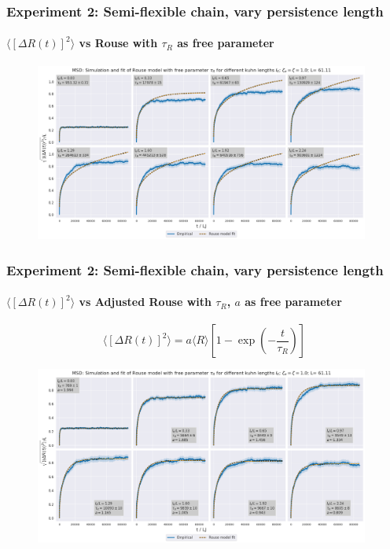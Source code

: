 \documentclass[handout]{beamer}
\newcommand{\mean}[1]{\langle #1 \rangle}
\begin{document}
\begin{frame}
    \frametitle{Experiment 2: Semi-flexible chain, vary persistence length}
    \framesubtitle{$\mean{[\Delta R(t)]^2}$ vs Rouse with $\tau_R$ as free parameter}

    \begin{figure}[h]
        \includegraphics[width=11cm]{./4-exp-delta_R-rouse_fit-tau.png}
    \end{figure}
\end{frame}

\begin{frame}
    \frametitle{Experiment 2: Semi-flexible chain, vary persistence length}
    \framesubtitle{$\mean{[\Delta R(t)]^2}$ vs Adjusted Rouse with $\tau_R$, $a$ as free parameter}
    $$ \mean{[\Delta R(t)]^2} = a \mean{R} [1 - \exp(-\frac{t}{\tau_R})] $$
    \begin{figure}[h]
        \includegraphics[width=11cm]{./4-exp-delta_R-rouse_fit-tau-a.png}
    \end{figure}
\end{frame}
\end{document}
